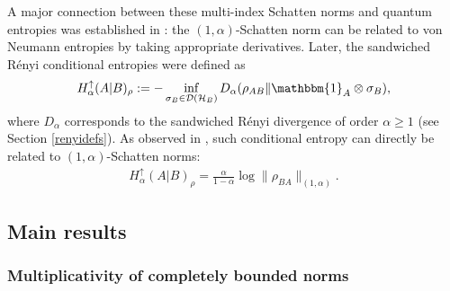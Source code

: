 \documentclass[11pt]{article}
\newcommand{\1}{\ensuremath{\mathbbm{1}}}
\theoremstyle{newdefinition}
\theoremstyle{newplain}
\theoremstyle{myplain}
\begin{document}
A major connection between these multi-index Schatten norms and quantum entropies was established in \cite{Devetak.2006}: the $(1,\alpha)$-Schatten norm can be related to von Neumann entropies by taking appropriate derivatives. Later, the sandwiched R\'enyi conditional entropies were defined as
\begin{align}
    H^\uparrow_\alpha(A|B)_\rho := -\inf_{\sigma_B\in \mathcal{D}(\mathcal{H}_B)}D_{\alpha}(\rho_{AB}\|\1_A\otimes\sigma_B), 
\end{align} 
where $D_\alpha$ corresponds to the sandwiched R\'{e}nyi divergence of order $\alpha\ge 1$ \cite{Lennert.2013,Wilde.2014,Book.Tomamichel.2016} (see Section \ref{renyidefs}). As observed in \cite{Beigi.2023}, such conditional entropy can directly be related to $(1,\alpha)$-Schatten norms:
\begin{align} \label{equ:intro.conditional.entropy}
   H^\uparrow_\alpha(A|B)_\rho = \frac{\alpha}{1-\alpha}\log\|\rho_{BA}\|_{(1,\alpha)}.
\end{align}


\subsection{Main results}


\subsubsection{Multiplicativity of completely bounded norms}
\end{document}

